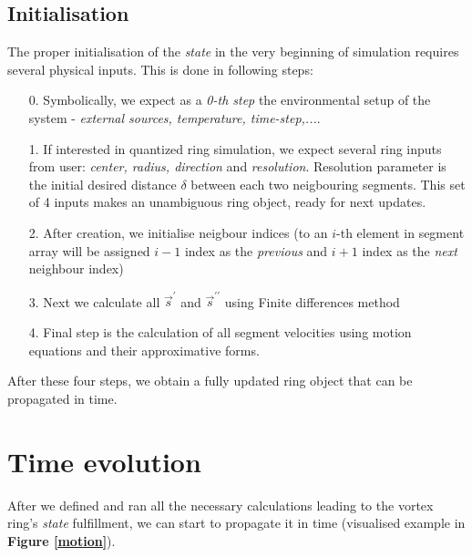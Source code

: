 \subsection*{Initialisation}

The proper initialisation of the \textit{state} in the very beginning of simulation requires several physical inputs. This is done in following steps:
\begin{itemize}
	\item[0.] Symbolically, we expect as a \textit{0-th step} the environmental setup of the system - \textit{external sources, temperature, time-step,...}.

	\item[1.] If interested in quantized ring simulation, we expect several ring inputs from user: \textit{center, radius, direction} and \textit{resolution}.
	Resolution parameter is the initial desired distance $\delta$ between each two neigbouring segments. This set of 4 inputs makes an unambiguous ring object, ready for next updates.

	\item[2.] After creation, we initialise neigbour indices (to an $i$-th element in segment array will be assigned $i-1$ index as the \textit{previous} and $i+1$ index as the \textit{next} neighbour index)
	\item[3.] Next we calculate all $\vec{s}^{\prime}$ and $\vec{s}^{\prime\prime}$ using Finite differences method
	\item[4.] Final step is the calculation of all segment velocities using motion equations and their approximative forms.
\end{itemize}

After these four steps, we obtain a fully updated ring object that can be propagated in time.

\section{Time evolution}

After we defined and ran all the necessary calculations leading to the vortex ring's \textit{state} fulfillment, we can start to propagate it in time (visualised example in \textbf{Figure \ref{motion}}).

